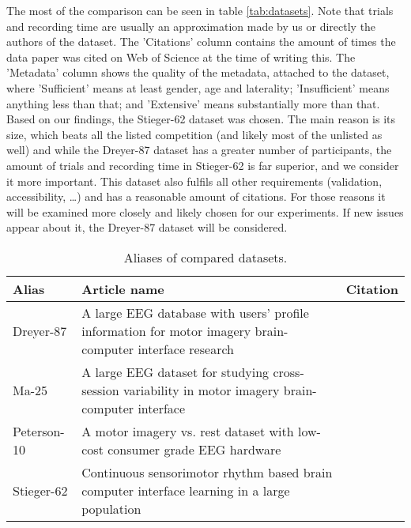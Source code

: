 \documentclass[english, he, bc, kiv, iso690alph]{fasthesis}
\begin{document}
The most of the comparison can be seen in table \ref{tab:datasets}. Note that trials and recording time are usually an approximation made by us or directly the authors of the dataset. The 'Citations' column contains the amount of times the data paper was cited on Web of Science at the time of writing this. The 'Metadata' column shows the quality of the metadata, attached to the dataset, where 'Sufficient' means at least gender, age and laterality; 'Insufficient' means anything less than that; and 'Extensive' means substantially more than that.
Based on our findings, the Stieger-62 dataset was chosen. The main reason is its size, which beats all the listed competition (and likely most of the unlisted as well) and while the Dreyer-87 dataset has a greater number of participants, the amount of trials and recording time in Stieger-62 is far superior, and we consider it more important. This dataset also fulfils all other requirements (validation, accessibility, \dots) and has a reasonable amount of citations. For those reasons it will be examined more closely and likely chosen for our experiments. If new issues appear about it, the Dreyer-87 dataset will be considered.

\begin{table}
\centering
\begin{tabular}{@{}p{}p{}p{}@{}}
\toprule
\textbf{Alias} & \textbf{Article name} & \textbf{Citation} \\
\midrule
Dreyer-87 & A large EEG database with users’ profile information for motor imagery brain-computer interface research & \cite{data:dreyer:23} \\
Ma-25 & A large EEG dataset for studying cross-session variability in motor imagery brain-computer interface & \cite{data:ma:22} \\
Peterson-10 & A motor imagery vs. rest dataset with low-cost consumer grade EEG hardware & \cite{data:peterson:22} \\
 Stieger-62 & Continuous sensorimotor rhythm based brain computer interface learning
 in a large population & \cite{data:stieger:21} \\
\bottomrule
\end{tabular}
\caption{Aliases of compared datasets.}
\label{tab:aliases}
\end{table}
\end{document}
